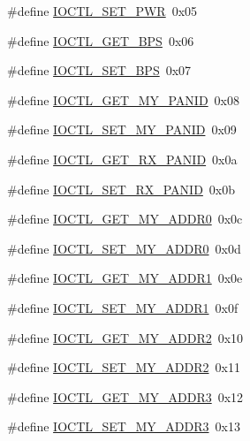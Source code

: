 \begin{DoxyCompactItemize}
\item 
\#define \hyperlink{drv-lazurite_8h_a30803cc75813ab91883de5e0afcbed18}{I\+O\+C\+T\+L\+\_\+\+S\+E\+T\+\_\+\+P\+W\+R}~0x05
\item 
\#define \hyperlink{drv-lazurite_8h_a4dabc585492d1437a82eabe8ff088753}{I\+O\+C\+T\+L\+\_\+\+G\+E\+T\+\_\+\+B\+P\+S}~0x06
\item 
\#define \hyperlink{drv-lazurite_8h_a63c0080891b346d4ab2546d16e391351}{I\+O\+C\+T\+L\+\_\+\+S\+E\+T\+\_\+\+B\+P\+S}~0x07
\item 
\#define \hyperlink{drv-lazurite_8h_a51c56004ee65b9f523a3ba16a3d71214}{I\+O\+C\+T\+L\+\_\+\+G\+E\+T\+\_\+\+M\+Y\+\_\+\+P\+A\+N\+I\+D}~0x08
\item 
\#define \hyperlink{drv-lazurite_8h_ab619c3bbffe8a9b936cadfd5778af173}{I\+O\+C\+T\+L\+\_\+\+S\+E\+T\+\_\+\+M\+Y\+\_\+\+P\+A\+N\+I\+D}~0x09
\item 
\#define \hyperlink{drv-lazurite_8h_a00cb6559e18cb174fe4837440e104a85}{I\+O\+C\+T\+L\+\_\+\+G\+E\+T\+\_\+\+R\+X\+\_\+\+P\+A\+N\+I\+D}~0x0a
\item 
\#define \hyperlink{drv-lazurite_8h_a5bae4ef9c76afdf9c52bd44559754def}{I\+O\+C\+T\+L\+\_\+\+S\+E\+T\+\_\+\+R\+X\+\_\+\+P\+A\+N\+I\+D}~0x0b
\item 
\#define \hyperlink{drv-lazurite_8h_a8083edbf57f772b3cc42446ddb83f67d}{I\+O\+C\+T\+L\+\_\+\+G\+E\+T\+\_\+\+M\+Y\+\_\+\+A\+D\+D\+R0}~0x0c
\item 
\#define \hyperlink{drv-lazurite_8h_a87a198a8b80c126ea381eeb6b1114830}{I\+O\+C\+T\+L\+\_\+\+S\+E\+T\+\_\+\+M\+Y\+\_\+\+A\+D\+D\+R0}~0x0d
\item 
\#define \hyperlink{drv-lazurite_8h_af7730df6256075b7cc1e798ece776009}{I\+O\+C\+T\+L\+\_\+\+G\+E\+T\+\_\+\+M\+Y\+\_\+\+A\+D\+D\+R1}~0x0e
\item 
\#define \hyperlink{drv-lazurite_8h_a55e722861a3131fc9218215c92115d6f}{I\+O\+C\+T\+L\+\_\+\+S\+E\+T\+\_\+\+M\+Y\+\_\+\+A\+D\+D\+R1}~0x0f
\item 
\#define \hyperlink{drv-lazurite_8h_a2b6e37632dcd3b89a50f36b7323ccfa4}{I\+O\+C\+T\+L\+\_\+\+G\+E\+T\+\_\+\+M\+Y\+\_\+\+A\+D\+D\+R2}~0x10
\item 
\#define \hyperlink{drv-lazurite_8h_a69d916aa4796531f1a36f199966c7224}{I\+O\+C\+T\+L\+\_\+\+S\+E\+T\+\_\+\+M\+Y\+\_\+\+A\+D\+D\+R2}~0x11
\item 
\#define \hyperlink{drv-lazurite_8h_ad340c00072307d931714e968ac9e3dac}{I\+O\+C\+T\+L\+\_\+\+G\+E\+T\+\_\+\+M\+Y\+\_\+\+A\+D\+D\+R3}~0x12
\item 
\#define \hyperlink{drv-lazurite_8h_a89c19cfe5add69a8fdea8a2b3a6f92ff}{I\+O\+C\+T\+L\+\_\+\+S\+E\+T\+\_\+\+M\+Y\+\_\+\+A\+D\+D\+R3}~0x13

\end{DoxyCompactItemize}
